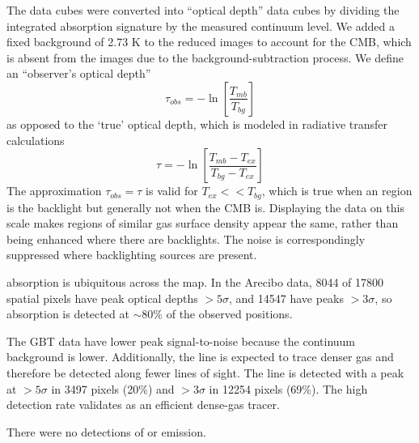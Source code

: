 The data cubes were converted into ``optical depth'' data cubes by dividing the
integrated \formaldehyde absorption signature by the measured continuum level.
We added a fixed background of 2.73 K to the reduced images to account for the
CMB, which is absent from the images due to the background-subtraction
process.  We define an ``observer's optical depth''
\begin{equation}
    \tau_{obs} = -\ln\left[\frac{T_{mb}}{T_{bg}}\right]
\end{equation}
as opposed to the `true' optical depth, which is modeled in radiative transfer
calculations
\begin{equation}
    \tau = -\ln\left[\frac{T_{mb}-T_{ex}}{T_{bg}-T_{ex}}\right]
\end{equation}
The approximation $\tau_{obs} = \tau$ is valid for $T_{ex} << T_{bg}$, which is
true when an \hii region is the backlight but generally not when the CMB is.
Displaying the data on this scale makes regions of similar gas surface density
appear the same, rather than being enhanced where there are backlights.  The
noise is correspondingly suppressed where backlighting sources are present.


\formaldehyde absorption is ubiquitous across the map.  In the Arecibo data,
8044 of 17800 spatial pixels have peak optical depths $>5\sigma$, and 14547
have peaks $>3\sigma$, so \formaldehyde absorption is detected at $\sim80\%$ of
the observed positions.

The GBT \formaldehyde \twotwo data have lower peak signal-to-noise because the
continuum background is lower.  Additionally, the \twotwo line is expected to
trace denser gas and therefore be detected along fewer lines of sight.  The
\twotwo line is detected with a peak at $>5\sigma$ in 3497 pixels (20\%) and
$>3\sigma$ in 12254 pixels (69\%).  The high detection rate validates
\formaldehyde as an efficient dense-gas tracer.

There were no detections of \formaldehyde \oneone or \twotwo emission.

